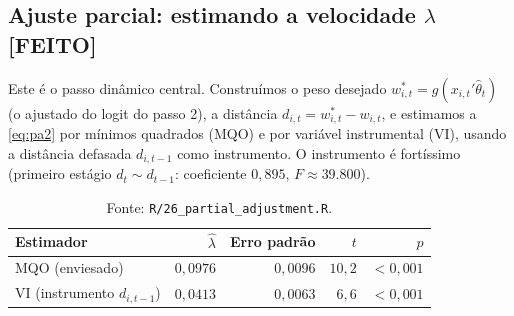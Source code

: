 \documentclass[11pt,a4paper]{article}
\newcommand{\feito}{\textcolor{feitog}{\textbf{[FEITO]}}}
\begin{document}
\subsection{Ajuste parcial: estimando a velocidade $\lambda$ \feito}
Este é o passo dinâmico central. Construímos o peso desejado $w^{*}_{i,t}=g(x_{i,t}'\widehat{\theta}_t)$
(o ajustado do logit do passo 2), a distância $d_{i,t}=w^{*}_{i,t}-w_{i,t}$, e estimamos a
\eqref{eq:pa2} por mínimos quadrados (MQO) e por variável instrumental (VI), usando a distância
defasada $d_{i,t-1}$ como instrumento. O instrumento é fortíssimo (primeiro estágio
$d_t\sim d_{t-1}$: coeficiente $0{,}895$, $F\approx 39.800$).

\begin{table}[h]\centering\small
\caption{Velocidade de ajuste $\lambda$ na equação $\Delta w_{i,t+1}=\lambda\,d_{i,t}+u$.
Erro-padrão agrupado por fundo. $N=10.570$ fundo-meses, 295 fundos, 70 meses.}
\label{tab:lambda}
\begin{tabular}{@{}lrrrr@{}}
\toprule
Estimador & $\widehat{\lambda}$ & Erro padrão & $t$ & $p$ \\
\midrule
MQO (enviesado)                 & $0{,}0976$ & $0{,}0096$ & $10{,}2$ & $<0{,}001$ \\
VI (instrumento $d_{i,t-1}$)    & $0{,}0413$ & $0{,}0063$ & $6{,}6$  & $<0{,}001$ \\
\bottomrule
\end{tabular}
\caption*{\footnotesize Fonte: \texttt{R/26\_partial\_adjustment.R}.}
\end{table}
\end{document}
